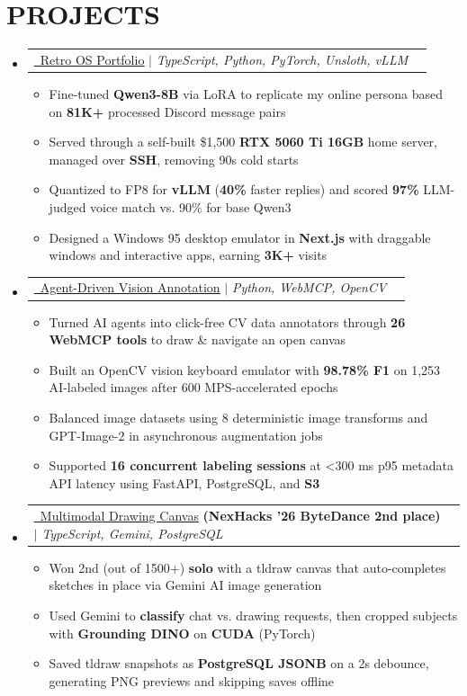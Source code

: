 \documentclass[letterpaper,11pt]{article}
\makeatletter
\newcommand{\resumeItem}[1]{
  \item\small{
    {#1 \vspace{-4pt}}
  }
}
\newcommand{\resumeProjectHeading}[2]{
    \item
    \begin{tabular*}{0.97\textwidth}[t]{l@{\extracolsep{\fill}}r}
      #1 & #2 \\
    \end{tabular*}\vspace{-7pt}
}
\newcommand{\resumeSubHeadingListStart}{\begin{itemize}[leftmargin=0.15in, label={}]}
\newcommand{\resumeSubHeadingListEnd}{\end{itemize}}
\newcommand{\resumeItemListStart}{\begin{itemize}}
\newcommand{\resumeItemListEnd}{\end{itemize}\vspace{-8pt}}
\newcommand{\vercelLogo}{\raisebox{0.02em}{\scalebox{1.43}[1.148]{$\blacktriangle$}}}
\makeatother
\begin{document}
\section{\textbf{PROJECTS}}
    \resumeSubHeadingListStart
    \resumeProjectHeading
  {\href{https://advm.dev/}{\textcolor{linkblue}{\underline{\vercelLogo\ Retro OS Portfolio}}}
  $|$
  \emph{TypeScript, Python, PyTorch, Unsloth, vLLM}
  }{}
  \resumeItemListStart
    \resumeItem{Fine-tuned \textbf{Qwen3-8B} via LoRA to replicate my online persona based on \textbf{81K+} processed Discord message pairs}
    \resumeItem{Served through a self-built \$1,500 \textbf{RTX 5060 Ti 16GB} home server, managed over \textbf{SSH}, removing 90s cold starts}
    \resumeItem{Quantized to FP8 for \textbf{vLLM} (\textbf{40\%} faster replies) and scored \textbf{97\%} LLM-judged voice match vs. 90\% for base Qwen3}
    \resumeItem{Designed a Windows 95 desktop emulator in \textbf{Next.js} with draggable windows and interactive apps, earning \textbf{3K+} visits}
  \resumeItemListEnd
    \resumeProjectHeading
  {\href{https://github.com/0xABAN/YADL}{\textcolor{linkblue}{\underline{\faGithub\ Agent-Driven Vision Annotation}}}
  $|$
  \emph{Python, WebMCP, OpenCV}
  }
  {}
  \resumeItemListStart
    \resumeItem{Turned AI agents into click-free CV data annotators through \textbf{26 WebMCP tools} to draw \& navigate an open canvas}
    \resumeItem{Built an OpenCV vision keyboard emulator with \textbf{98.78\% F1} on 1,253 AI-labeled images after 600 MPS-accelerated epochs}
    \resumeItem{Balanced image datasets using 8 deterministic image transforms and GPT-Image-2 in asynchronous augmentation jobs}
    \resumeItem{Supported \textbf{16 concurrent labeling sessions} at \textless{}300 ms p95 metadata API latency using FastAPI, PostgreSQL, and \textbf{S3}}
  \resumeItemListEnd
    \resumeProjectHeading
  {\href{https://github.com/AdamPSU/maestro}{\textcolor{linkblue}{\underline{\faGithub\ Multimodal Drawing Canvas}}} \textbf{(NexHacks '26 ByteDance 2nd place)}
  $|$
  \emph{TypeScript, Gemini, PostgreSQL}
  }
  {}
  \resumeItemListStart
    \resumeItem{Won 2nd (out of 1500+) \textbf{solo} with a tldraw canvas that auto-completes sketches in place via Gemini AI image generation}
    \resumeItem{Used Gemini to \textbf{classify} chat vs. drawing requests, then cropped subjects with \textbf{Grounding DINO} on \textbf{CUDA} (PyTorch)}
    \resumeItem{Saved tldraw snapshots as \textbf{PostgreSQL JSONB} on a 2s debounce, generating PNG previews and skipping saves offline}
  \resumeItemListEnd
    \resumeSubHeadingListEnd
\end{document}

